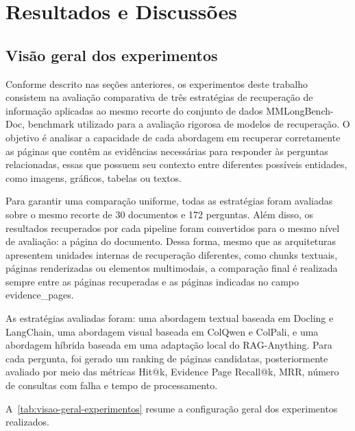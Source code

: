 \chapter{Resultados e Discussões}

\section{Visão geral dos experimentos}

Conforme descrito nas seções anteriores, os experimentos deste trabalho consistem na avaliação comparativa de três estratégias de recuperação de informação aplicadas ao mesmo recorte do conjunto de dados MMLongBench-Doc\cite{MA2024MMLONGBENCHDOC}, benchmark utilizado para a avaliação rigorosa de modelos de recuperação. O objetivo é analisar a capacidade de cada abordagem em recuperar corretamente as páginas que contêm as evidências necessárias para responder às perguntas relacionadas, essas que possuem seu contexto entre diferentes possíveis entidades, como imagens, gráficos, tabelas ou textos.

Para garantir uma comparação uniforme, todas as estratégias foram avaliadas sobre o mesmo recorte de 30 documentos e 172 perguntas. Além disso, os resultados recuperados por cada pipeline foram convertidos para o mesmo nível de avaliação: a página do documento. Dessa forma, mesmo que as arquiteturas apresentem unidades internas de recuperação diferentes, como chunks textuais, páginas renderizadas ou elementos multimodais, a comparação final é realizada sempre entre as páginas recuperadas e as páginas indicadas no campo evidence\_pages.

As estratégias avaliadas foram: uma abordagem textual baseada em Docling e LangChain, uma abordagem visual baseada em ColQwen e ColPali, e uma abordagem híbrida baseada em uma adaptação local do RAG-Anything. Para cada pergunta, foi gerado um ranking de páginas candidatas, posteriormente avaliado por meio das métricas Hit@k, Evidence Page Recall@k, MRR, número de consultas com falha e tempo de processamento.

A~\ref{tab:visao-geral-experimentos} resume a configuração geral dos experimentos realizados.

